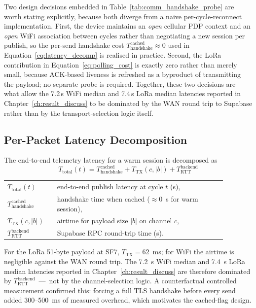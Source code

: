 \noindent
Two design decisions embedded in Table~\ref{tab:comm_handshake_probe} are worth stating explicitly, because both diverge from a naive per-cycle-reconnect implementation. First, the device maintains an \emph{open} cellular PDP context and an \emph{open} WiFi association between cycles rather than negotiating a new session per publish, so the per-send handshake cost $T_{\mathrm{handshake}}^{\mathrm{cached}} \approx 0$ used in Equation~\ref{eq:latency_decomp} is realised in practice. Second, the LoRa contribution in Equation~\ref{eq:polling_cost} is exactly zero rather than merely small, because ACK-based liveness is refreshed as a byproduct of transmitting the payload; no separate probe is required. Together, these two decisions are what allow the 7.2\,s WiFi median and 7.4\,s LoRa median latencies reported in Chapter~\ref{ch:result_discuss} to be dominated by the WAN round trip to Supabase rather than by the transport-selection logic itself.

\subsection{Per-Packet Latency Decomposition}
\label{sec:comm_latency_decomp}

The end-to-end telemetry latency for a warm session is decomposed as
\begin{equation}
T_{\mathrm{total}}(t) = T_{\mathrm{handshake}}^{\mathrm{cached}} + T_{\mathrm{TX}}(c, |b|) + T_{\mathrm{RTT}}^{\mathrm{backend}}
\label{eq:latency_decomp}
\end{equation}
\noindent\begin{tabular}{@{}p{0.20\linewidth}@{\quad}p{0.68\linewidth}@{}}
$T_{\mathrm{total}}(t)$ & end-to-end publish latency at cycle $t$ (s), \\
$T_{\mathrm{handshake}}^{\mathrm{cached}}$ & handshake time when cached ($\approx$0~s for warm session), \\
$T_{\mathrm{TX}}(c, |b|)$ & airtime for payload size $|b|$ on channel $c$, \\
$T_{\mathrm{RTT}}^{\mathrm{backend}}$ & Supabase RPC round-trip time (s).
\end{tabular}

\vspace{0.5em}
For the LoRa 51-byte payload at SF7, $T_{\mathrm{TX}} = 62$~ms; for WiFi the airtime is negligible against the WAN round trip. The 7.2~s WiFi median and 7.4~s LoRa median latencies reported in Chapter~\ref{ch:result_discuss} are therefore dominated by $T_{\mathrm{RTT}}^{\mathrm{backend}}$~---~not by the channel-selection logic. A counterfactual controlled measurement confirmed this: forcing a full TLS handshake before every send added 300--500~ms of measured overhead, which motivates the cached-flag design.

